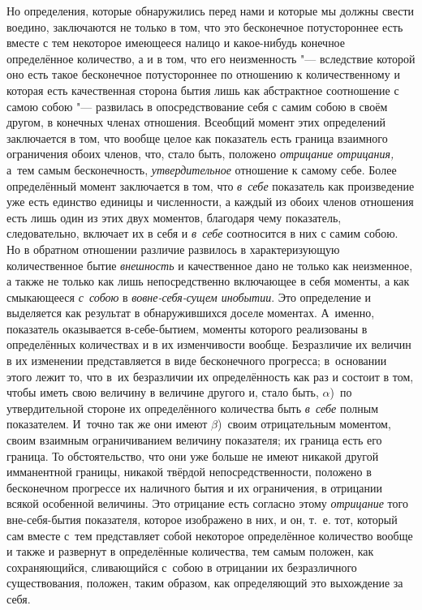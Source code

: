 Но определения, которые обнаружились перед нами и которые мы должны свести
воедино, заключаются не только в том, что это бесконечное потустороннее есть
вместе с тем некоторое имеющееся налицо и какое-нибудь конечное определённое
количество, а и в том, что его неизменность "--- вследствие которой оно есть
такое бесконечное потустороннее по отношению к количественному и которая есть
качественная сторона бытия лишь как абстрактное соотношение с самою собою "---
развилась в опосредствование себя с самим собою в своём другом, в конечных
членах отношения. Всеобщий момент этих определений заключается в том, что
вообще целое как показатель есть граница взаимного ограничения обоих членов,
что, стало быть, положено {\em отрицание отрицания,} а~тем самым бесконечность,
{\em утвердительное} отношение к самому себе. Более определённый момент
заключается в том, что {\em в~себе} показатель как произведение уже есть
единство единицы и численности, а каждый из обоих членов отношения есть лишь
один из этих двух моментов, благодаря чему показатель, следовательно, включает
их в себя и {\em в~себе} соотносится в них с самим собою. Но в обратном
отношении различие развилось в характеризующую количественное бытие
{\em внешность} и качественное дано не только как неизменное, а также не только
как лишь непосредственно включающее в себя моменты, а как смыкающееся
{\em с~собою} в {\em вовне-себя-сущем инобытии}. Это определение и выделяется
как результат в обнаружившихся доселе моментах. А~именно, показатель
оказывается в-себе-бытием, моменты которого реализованы в определённых
количествах и в их изменчивости вообще. Безразличие их величин в их изменении
представляется в виде бесконечного прогресса; в~основании этого лежит то, что
в~их безразличии их определённость как раз и состоит в том, чтобы иметь свою
величину в величине другого и, стало быть, $\alpha$)~по утвердительной стороне
их определённого количества быть {\em в~себе} полным показателем. И~точно так
же они имеют $\beta$)~своим отрицательным моментом, своим взаимным
ограничиванием величину показателя; их граница есть его граница. То
обстоятельство, что они уже больше не имеют никакой другой имманентной границы,
никакой твёрдой непосредственности, положено в бесконечном
прогрессе их наличного бытия и их ограничения, в отрицании всякой особенной
величины. Это отрицание есть согласно этому {\em отрицание} того вне-себя-бытия
показателя, которое изображено в них, и он, т.~е. тот, который сам вместе с~тем
представляет собой некоторое определённое количество вообще и также и развернут
в определённые количества, тем самым положен, как сохраняющийся, сливающийся
с~собою в отрицании их безразличного существования, положен, таким образом, как
определяющий это выхождение за себя.

